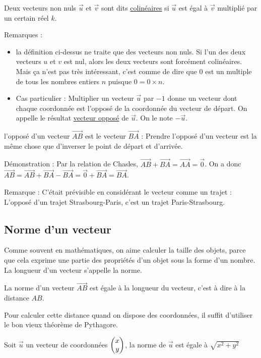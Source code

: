 \documentclass[10pt,a4paper,oneside]{book}
\begin{document}
\begin{de}
  Deux vecteurs non nuls $\overrightarrow{u}$ et $\overrightarrow{v}$ sont dits \underline{colinéaires} si $\overrightarrow{u}$ est égal à $\overrightarrow{v}$ multiplié par un certain réel $k$. 
\end{de}

Remarques : 
\begin{itemize}
  \item la définition ci-dessus ne traite que des vecteurs non nuls. Si l'un des deux vecteurs $u$ et $v$ est nul, alors les deux vecteurs sont forcément colinéaires. Mais ça n'est pas très intéressant, c'est comme de dire que $0$ est un multiple de tous les nombres entiers $n$ puisque $0=0 \times n$.
  \item Cas particulier : Multiplier un vecteur $\overrightarrow{u}$ par $-1$ donne un vecteur dont chaque coordonnée 
  est l'opposé de la coordonnée du vecteur de départ. On appelle le résultat \underline{vecteur opposé} de $\overrightarrow{u}$. On le note $-\overrightarrow{u}$.
\end{itemize}

\begin{prop}
  l'opposé d'un vecteur $\overrightarrow{AB}$ est le vecteur $\overrightarrow{BA}$ : Prendre l'opposé d'un vecteur est la même chose que d'inverser le point de départ et d'arrivée. 
\end{prop}

Démonstration : Par la relation de Chasles, $\overrightarrow{AB} + \overrightarrow{BA} = \overrightarrow{AA} = \overrightarrow{0}$. On a donc $\overrightarrow{AB} = \overrightarrow{AB} + \overrightarrow{BA} - \overrightarrow{BA} = \overrightarrow{0} + \overrightarrow{BA} = \overrightarrow{BA}$.

Remarque : C'était prévisible en considérant le vecteur comme un trajet : L'opposé d'un trajet Strasbourg-Paris, c'est un trajet Paris-Strasbourg.  

\subsection{Norme d'un vecteur}

Comme souvent en mathématiques, on aime calculer la taille des objets, parce que cela exprime une partie des propriétés d'un objet sous la forme d'un nombre. La longueur d'un vecteur s'appelle la norme.

\begin{de}
  La norme d'un vecteur $\overrightarrow{AB}$ est égale à la longueur du vecteur, c'est à dire à la distance $AB$.
\end{de}

Pour calculer cette distance quand on dispose des coordonnées, il suffit d'utiliser le bon vieux théorème de Pythagore.

\begin{prop}
  Soit $\overrightarrow{u}$ un vecteur de coordonnées $ \begin{pmatrix} x\\ y \end{pmatrix}$, la norme de $\overrightarrow{u}$ est égale à $\sqrt{x^2+y^2}$
\end{prop}
\end{document}
